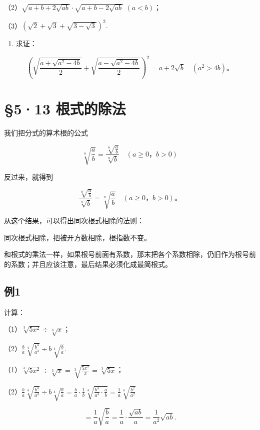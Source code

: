 （2）\(\sqrt{a + b + 2\sqrt{ab}}\cdot \sqrt{a + b - 2\sqrt{ab}}\) \((a < b)\)；

（3）\((\sqrt{2} + \sqrt{3} + \sqrt{3 - \sqrt{3}})^2.\)

\begin{enumerate}[start=4]
\item
  求证：
\end{enumerate}

\[
\left(\sqrt {\frac{a + \sqrt {a ^ {2} - 4 b}}{2}} + \sqrt {\frac{a - \sqrt {a ^ {2} - 4 b}}{2}}\right) ^ {2} = a + 2 \sqrt {b} \quad (a ^ {2} > 4 b)\text{。}
\]

\section{§5·13 根式的除法}

我们把分式的算术根的公式

\[
\sqrt[n]{\frac{a}{b}} = \frac{\sqrt[n]{\frac{a}{b}}}{\sqrt[n]{b}} \quad (a \geqslant 0\text{，} b > 0)
\]

反过来，就得到

\[
\frac{\sqrt[n]{\frac{a}{b}}}{\sqrt[n]{b}} = \sqrt[n]{\frac{a}{b}} \quad (a \geqslant 0\text{，} b > 0)\text{。}
\]

从这个结果，可以得出同次根式相除的法则：

同次根式相除，把被开方数相除，根指数不变。

和根式的乘法一样，如果根号前面有系数，那末把各个系数相除，仍旧作为根号前的系数；并且应该注意，最后结果必须化成最简根式。

\subsection{例1}

计算：

（1）\(\sqrt[3]{5x^2} \div \sqrt[3]{x}\)；

（2）\(\frac{b}{a}\sqrt[4]{\frac{b^3}{a^3}}\div b\sqrt[4]{\frac{b}{a}}.\)

（1）\(\sqrt[3]{5x^2} \div \sqrt[3]{x} = \sqrt[3]{\frac{5x^2}{x}} = \sqrt[3]{5x}\)；

（2）\(\frac{b}{a}\sqrt[4]{\frac{b^3}{a^3}}\div b\sqrt[4]{\frac{b}{a}} = \frac{b}{a}\cdot \frac{1}{b}\sqrt[4]{\frac{b^3}{a^3}\cdot\frac{a}{b}} = \frac{1}{a}\sqrt[4]{\frac{b^2}{a^2}}\)

\[
= \frac{1}{a} \sqrt {\frac{b}{a}} = \frac{1}{a} \cdot \frac{\sqrt {a b}}{a} = \frac{1}{a ^ {2}} \sqrt {a b}.
\]

